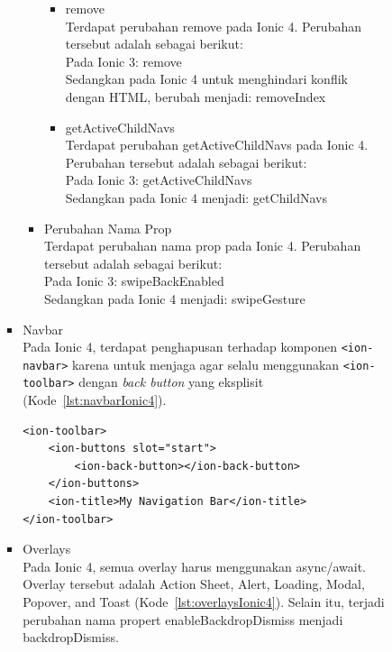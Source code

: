 \begin{enumerate}
\begin{enumerate}
\begin{itemize}
\begin{itemize}
\begin{itemize}
\begin{itemize}
						\item remove \\
						Terdapat perubahan remove pada Ionic 4. Perubahan tersebut adalah sebagai berikut:\\
						Pada Ionic 3: remove \\
						Sedangkan pada Ionic 4 untuk menghindari konflik dengan HTML, berubah menjadi: removeIndex 

						\item getActiveChildNavs \\
						Terdapat perubahan getActiveChildNavs pada Ionic 4. Perubahan tersebut adalah sebagai berikut:\\
						Pada Ionic 3: getActiveChildNavs \\
						Sedangkan pada Ionic 4 menjadi: getChildNavs
					\end{itemize}

					\item Perubahan Nama Prop \\
					Terdapat perubahan nama prop pada Ionic 4. Perubahan tersebut adalah sebagai berikut:\\
					Pada Ionic 3: swipeBackEnabled   \\
					Sedangkan pada Ionic 4 menjadi: swipeGesture
				\end{itemize}	

\newpage

				\item Navbar \\
				Pada Ionic 4, terdapat penghapusan terhadap komponen \texttt{<ion-navbar>} karena untuk menjaga agar selalu menggunakan \texttt{<ion-toolbar>} dengan {\it back button} yang eksplisit (Kode~\ref{lst:navbarIonic4}).				
				
				\begin{lstlisting}[label={lst:navbarIonic4}, caption=Penggunaan Navbar pada Ionic 4 dengan {\it Back Button}]
<ion-toolbar>
	<ion-buttons slot="start">
		<ion-back-button></ion-back-button>
	</ion-buttons>
	<ion-title>My Navigation Bar</ion-title>
</ion-toolbar>
				\end{lstlisting}
				
				\item Overlays \\
				Pada Ionic 4, semua overlay harus menggunakan async/await. Overlay tersebut adalah Action Sheet, Alert, Loading, Modal, Popover, and Toast (Kode~\ref{lst:overlaysIonic4}). Selain itu, terjadi perubahan nama propert enableBackdropDismiss menjadi backdropDismiss.
				

\end{itemize}
\end{itemize}
\end{enumerate}
\end{enumerate}
